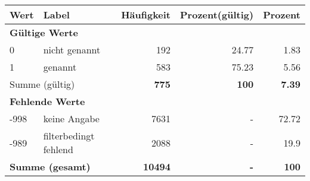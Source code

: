      \begin{longtable}{lXrrr}
     \toprule
     \textbf{Wert} & \textbf{Label} & \textbf{Häufigkeit} & \textbf{Prozent(gültig)} & \textbf{Prozent} \\
     \endhead
     \midrule
     \multicolumn{5}{l}{\textbf{Gültige Werte}}\\

     0 &
     \multicolumn{1}{X}{ nicht genannt   } &


       \num{192} &
       \num[round-mode=places,round-precision=2]{24.77} &
         \num[round-mode=places,round-precision=2]{1.83} \\

     1 &
     \multicolumn{1}{X}{ genannt   } &


       \num{583} &
       \num[round-mode=places,round-precision=2]{75.23} &
         \num[round-mode=places,round-precision=2]{5.56} \\
     \midrule
     \multicolumn{2}{l}{Summe (gültig)} &
       \textbf{\num{775}} &
     \textbf{\num{100}} &
       \textbf{\num[round-mode=places,round-precision=2]{7.39}} \\
     \multicolumn{5}{l}{\textbf{Fehlende Werte}}\\
       -998 &
       keine Angabe &
         \num{7631} &
        - &
         \num[round-mode=places,round-precision=2]{72.72} \\
       -989 &
       filterbedingt fehlend &
         \num{2088} &
        - &
         \num[round-mode=places,round-precision=2]{19.9} \\
     \midrule
     \multicolumn{2}{l}{\textbf{Summe (gesamt)}} &
          \textbf{\num{10494}} &
        \textbf{-} &
        \textbf{\num{100}} \\
     \bottomrule
     \end{longtable}
     
